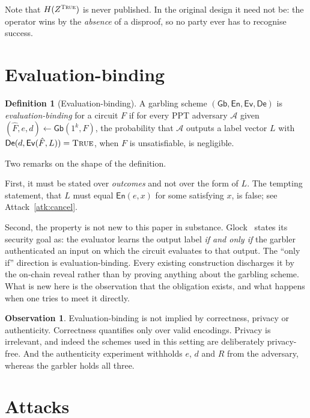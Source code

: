 \documentclass[11pt,a4paper]{article}
\theoremstyle{definition}
\newtheorem{definition}{Definition}
\newtheorem{observation}{Observation}
\theoremstyle{plain}
\newcommand{\Gb}{\mathsf{Gb}}
\newcommand{\En}{\mathsf{En}}
\newcommand{\Ev}{\mathsf{Ev}}
\newcommand{\De}{\mathsf{De}}
\newcommand{\Hh}{H}
\begin{document}
Note that $\Hh(Z^{\textsc{True}})$ is never published. In the original design it
need not be: the operator wins by the \emph{absence} of a disproof, so no party
ever has to recognise success.

\section{Evaluation-binding}

\begin{definition}[Evaluation-binding]
\label{def:evb}
A garbling scheme $(\Gb,\En,\Ev,\De)$ is \emph{evaluation-binding} for a circuit
$F$ if for every PPT adversary $\mathcal{A}$ given
$(\hat F, e, d) \leftarrow \Gb(1^{k}, F)$, the probability that $\mathcal{A}$
outputs a label vector $L$ with $\De(d, \Ev(\hat F, L)) = \textsc{True}$, when
$F$ is unsatisfiable, is negligible.
\end{definition}

Two remarks on the shape of the definition.

First, it must be stated over \emph{outcomes} and not over the form of $L$. The
tempting statement, that $L$ must equal $\En(e,x)$ for some satisfying $x$, is
false; see Attack~\ref{atk:cancel}.

Second, the property is not new to this paper in substance. Glock~\cite{Glock}
states its security goal as: the evaluator learns the output label \emph{if and
only if} the garbler authenticated an input on which the circuit evaluates to
that output. The ``only if'' direction is evaluation-binding. Every existing
construction discharges it by the on-chain reveal rather than by proving
anything about the garbling scheme. What is new here is the observation that the
obligation exists, and what happens when one tries to meet it directly.

\begin{observation}
Evaluation-binding is not implied by correctness, privacy or authenticity.
Correctness quantifies only over valid encodings. Privacy is irrelevant, and
indeed the schemes used in this setting are deliberately privacy-free. And the
authenticity experiment withholds $e$, $d$ and $R$ from the adversary, whereas
the garbler holds all three.
\end{observation}

\section{Attacks}
\label{sec:attacks}
\end{document}
